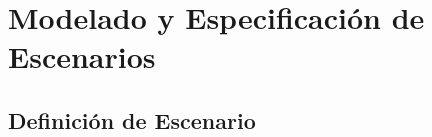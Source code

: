 \documentclass[slidestop,xcolor=pst,dvips,blue]{beamer}
\begin{document}
%
%
%
%
%
%

\section{Modelado y Especificación de Escenarios}

\subsection{Definición de Escenario}
\end{document}
